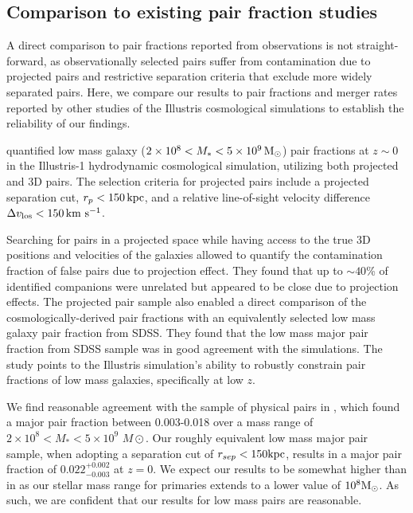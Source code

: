 \documentclass[twocolumn]{aastex631}
\begin{document}
    
\subsection{Comparison to existing pair fraction studies}\label{sec:disc-comp}
    A direct comparison to pair fractions reported from observations is not straight-forward, as observationally selected pairs suffer from contamination due to projected pairs and restrictive separation criteria that exclude more widely separated pairs.
    Here, we compare our results to pair fractions and merger rates reported by other studies of the Illustris cosmological simulations to establish the reliability of our findings. 

        \citet{Besla2018} quantified low mass galaxy ($2\times10^{8} < M_{*} < 5\times10^{9}\,\mathrm{M}_\odot$) pair fractions at $z\sim0$ in the Illustris-1 hydrodynamic cosmological simulation, utilizing both projected and 3D pairs.
        The selection criteria for projected pairs include a projected separation cut, $r_{p} < 150\,\mathrm{kpc}$, and a relative line-of-sight velocity difference $\Delta v_{\rm los} < 150\,\mathrm{km}~\mathrm{s}^{-1}$.
        
        Searching for pairs in a projected space while having access to the true 3D positions and velocities of the galaxies allowed \cite{Besla2018} to quantify the contamination fraction of false pairs due to projection effect. 
        They found that up to $\sim40$\% of identified companions were unrelated but appeared to be close due to projection effects. 
        The projected pair sample also enabled a direct comparison of the cosmologically-derived pair fractions with an equivalently selected low mass galaxy pair fraction from SDSS.
        They found that the low mass major pair fraction from SDSS sample was in good agreement with the simulations. The~\citet{Besla2018} study points to the Illustris simulation's ability to robustly constrain pair fractions of low mass galaxies, specifically at low $z$.

        We find reasonable agreement with the sample of physical pairs in \cite{Besla2018}, which found a major pair fraction between 0.003-0.018 over a mass range of $2\times 10^8 < M_* < 5 \times 10^9$ $M\odot$.
        Our roughly equivalent low mass major pair sample, when adopting a separation cut of $r_{sep}<150\mathrm{kpc}$, results in a major pair fraction of $0.022^{+0.002}_{-0.003}$ at $z=0$. We expect our results to be somewhat higher than in \cite{Besla2018} as our stellar mass range for primaries extends to a lower value of $10^8\mathrm{M}_\odot$. As such, we are confident that our results for low mass pairs are reasonable.  
\end{document}
